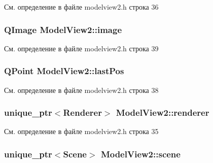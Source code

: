 См. определение в файле modelview2.\+h строка 36

\subsubsection[{\texorpdfstring{image}{image}}]{\setlength{\rightskip}{0pt plus 5cm}Q\+Image Model\+View2\+::image\hspace{0.3cm}{\ttfamily [private]}}\hypertarget{class_model_view2_acfbdec1f9d732929c211bd7f7fe60132}{}\label{class_model_view2_acfbdec1f9d732929c211bd7f7fe60132}


См. определение в файле modelview2.\+h строка 39

\subsubsection[{\texorpdfstring{last\+Pos}{lastPos}}]{\setlength{\rightskip}{0pt plus 5cm}Q\+Point Model\+View2\+::last\+Pos\hspace{0.3cm}{\ttfamily [private]}}\hypertarget{class_model_view2_a2ab7665cf858a630e0c08accf1cad25b}{}\label{class_model_view2_a2ab7665cf858a630e0c08accf1cad25b}


См. определение в файле modelview2.\+h строка 38

\subsubsection[{\texorpdfstring{renderer}{renderer}}]{\setlength{\rightskip}{0pt plus 5cm}unique\+\_\+ptr$<${\bf Renderer}$>$ Model\+View2\+::renderer\hspace{0.3cm}{\ttfamily [private]}}\hypertarget{class_model_view2_ab6f007ccf983cf121c11717f90bfe7a8}{}\label{class_model_view2_ab6f007ccf983cf121c11717f90bfe7a8}


См. определение в файле modelview2.\+h строка 35

\subsubsection[{\texorpdfstring{scene}{scene}}]{\setlength{\rightskip}{0pt plus 5cm}unique\+\_\+ptr$<${\bf Scene}$>$ Model\+View2\+::scene\hspace{0.3cm}{\ttfamily [private]}}\hypertarget{class_model_view2_acb280540a8957a2f7a50ebf689608831}{}\label{class_model_view2_acb280540a8957a2f7a50ebf689608831}


